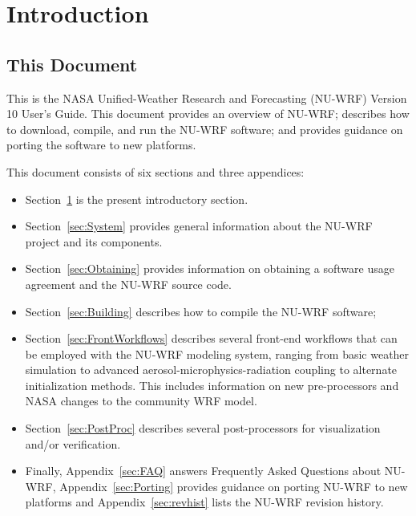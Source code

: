 
\section{Introduction}
\label{sec:Introduction}

\subsection{This Document}
\label{subsec:ThisDocument}
This is the NASA Unified-Weather Research and Forecasting (NU-WRF) Version 10 
User's Guide. This document provides an overview of NU-WRF; describes how to 
download, compile, and run the NU-WRF software; and provides guidance on 
porting the software to new platforms.

This document consists of six sections and three appendices:

\begin{itemize}
\item Section~\ref{sec:Introduction} is the present introductory section.

\item Section~\ref{sec:System} provides general information about the 
NU-WRF project and its components.

\item Section~\ref{sec:Obtaining} provides information on obtaining a
software usage agreement and the NU-WRF source code.

\item Section~\ref{sec:Building} describes how to compile the NU-WRF software;

\item Section~\ref{sec:FrontWorkflows} describes several front-end workflows 
that can be employed with the NU-WRF modeling system, ranging from basic 
weather simulation to advanced aerosol-microphysics-radiation coupling to
alternate initialization methods.  This includes information on new 
pre-processors and NASA changes to the community WRF model.

\item Section~\ref{sec:PostProc} describes several post-processors for 
visualization and/or verification.

\item Finally, Appendix~\ref{sec:FAQ} answers Frequently Asked Questions about
NU-WRF, Appendix~\ref{sec:Porting} provides guidance on porting NU-WRF
to new platforms and Appendix~\ref{sec:revhist} lists the NU-WRF revision history.

\end{itemize}

